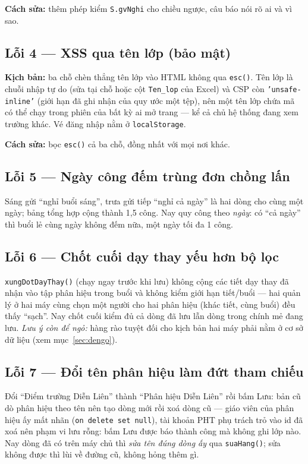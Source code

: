 \documentclass[12pt,a4paper]{article}
\newcommand{\muc}[1]{\textbf{#1}}
\begin{document}
\muc{Cách sửa:} thêm phép kiểm \texttt{S.gvNghi} cho chiều ngược, câu báo nói rõ
ai và vì sao.

\subsection*{Lỗi 4 --- XSS qua tên lớp (bảo mật)}
\muc{Kịch bản:} ba chỗ chèn thẳng tên lớp vào HTML không qua \texttt{esc()}.
Tên lớp là chuỗi nhập tự do (sửa tại chỗ hoặc cột \texttt{Ten\_lop} của Excel)
và CSP còn \texttt{'unsafe-inline'} (giới hạn đã ghi nhận của quy ước một tệp),
nên một tên lớp chứa mã có thể chạy trong phiên của bất kỳ ai mở trang --- kể cả
chủ hệ thống đang xem trường khác. Vé đăng nhập nằm ở \texttt{localStorage}.

\muc{Cách sửa:} bọc \texttt{esc()} cả ba chỗ, đồng nhất với mọi nơi khác.

\subsection*{Lỗi 5 --- Ngày công đếm trùng đơn chồng lấn}
Sáng gửi ``nghỉ buổi sáng'', trưa gửi tiếp ``nghỉ cả ngày'' là hai dòng cho cùng
một ngày; bảng tổng hợp cộng thành 1,5 công. Nay quy công theo \emph{ngày}: có
``cả ngày'' thì buổi lẻ cùng ngày không đếm nữa, một ngày tối đa 1 công.

\subsection*{Lỗi 6 --- Chốt cuối dạy thay yếu hơn bộ lọc}
\texttt{xungDotDayThay()} (chạy ngay trước khi lưu) không cộng các tiết dạy thay
đã nhận vào tập phân hiệu trong buổi và không kiểm giới hạn tiết/buổi --- hai
quản lý ở hai máy cùng chọn một người cho hai phân hiệu (khác tiết, cùng buổi)
đều thấy ``sạch''. Nay chốt cuối kiểm đủ cả dòng đã lưu lẫn dòng trong chính mẻ
đang lưu. \emph{Lưu ý còn để ngỏ:} hàng rào tuyệt đối cho kịch bản hai máy phải
nằm ở cơ sở dữ liệu (xem mục~\ref{sec:dengo}).

\subsection*{Lỗi 7 --- Đổi tên phân hiệu làm đứt tham chiếu}
Đổi ``Điểm trường Diễn Liên'' thành ``Phân hiệu Diễn Liên'' rồi bấm Lưu: bản cũ
dò phân hiệu theo tên nên tạo dòng mới rồi xoá dòng cũ --- giáo viên của phân
hiệu ấy mất nhãn (\texttt{on delete set null}), tài khoản PHT phụ trách trỏ vào
id đã xoá nên phạm vi lưu rỗng: bấm Lưu được báo thành công mà không ghi lớp
nào. Nay dòng đã có trên máy chủ thì \emph{sửa tên đúng dòng ấy} qua
\texttt{suaHang()}; sửa không được thì lùi về đường cũ, không hỏng thêm gì.
\end{document}
